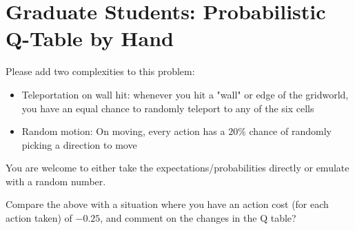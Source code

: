 \documentclass{exam}
\begin{document}
\section{Graduate Students: Probabilistic Q-Table by Hand}

Please add two complexities to this problem:

\begin{itemize}
    \item Teleportation on wall hit: whenever you hit a "wall" or edge of the gridworld, you have an equal chance to randomly teleport to any of the six cells
    \item Random motion: On moving, every action has a $20\%$ chance of randomly picking a direction to move
\end{itemize}

You are welcome to either take the expectations/probabilities directly or emulate with a random number.

Compare the above with a situation where you have an action cost (for each action taken) of $-0.25$, and comment on the changes in the Q table?
\end{document}
